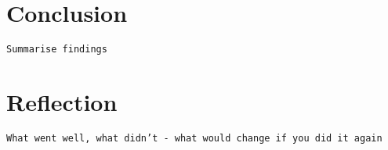 \section{Conclusion}
	\texttt{Summarise findings}
	
\section{Reflection}
	\texttt{What went well, what didn't - what would change if you did it again}
	
\newpage